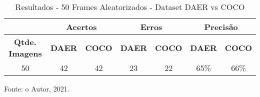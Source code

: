 \begin{table}[htp]
\centering
\caption{Resultados - 50 Frames Aleatorizados - Dataset DAER vs COCO }
\label{tab:daer_biased}{%
\begin{tabular}{ccccccc}
\textbf{} & \multicolumn{2}{c}{\textbf{Acertos}} & \multicolumn{2}{c}{\textbf{Erros}} & \multicolumn{2}{c}{\textbf{Precisão}} \\ \hline
\textbf{Qtde. Imagens}              & \textbf{DAER}     & \textbf{COCO}    & \textbf{DAER}    & \textbf{COCO}   & \textbf{DAER}     & \textbf{COCO}     \\ \hline
50                     & 42                & 42               & 23               & 22              & 65\%              & 66\%              \\ \hline
\end{tabular}%

Fonte: o Autor, 2021.
}
\end{table}